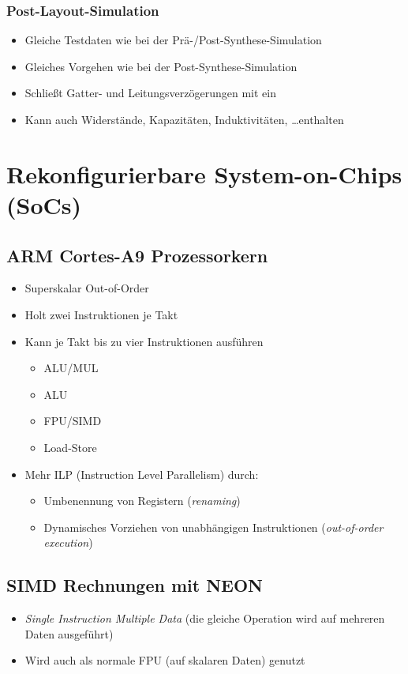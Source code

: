 		\subsection{Post-Layout-Simulation}
			\begin{itemize}
				\item Gleiche Testdaten wie bei der Prä-/Post-Synthese-Simulation
				\item Gleiches Vorgehen wie bei der Post-Synthese-Simulation
				\item Schließt Gatter- und Leitungsverzögerungen mit ein
				\item Kann auch Widerstände, Kapazitäten, Induktivitäten, \dots enthalten
			\end{itemize}

\chapter{Rekonfigurierbare System-on-Chips (SoCs)}
	\section{ARM Cortes-A9 Prozessorkern}
		\begin{itemize}
			\item Superskalar Out-of-Order
			\item Holt zwei Instruktionen je Takt
			\item Kann je Takt bis zu vier Instruktionen ausführen
				\begin{itemize}
					\item ALU/MUL
					\item ALU
					\item FPU/SIMD
					\item Load-Store
				\end{itemize}
			\item Mehr ILP (Instruction Level Parallelism) durch:
				\begin{itemize}
					\item Umbenennung von Registern (\textit{renaming})
					\item Dynamisches Vorziehen von unabhängigen Instruktionen (\textit{out-of-order execution})
				\end{itemize}
		\end{itemize}
	
	\section{SIMD Rechnungen mit NEON}
		\begin{itemize}
			\item \textit{Single Instruction Multiple Data} (die gleiche Operation wird auf mehreren Daten ausgeführt)
			\item Wird auch als normale FPU (auf skalaren Daten) genutzt
		\end{itemize}
	
